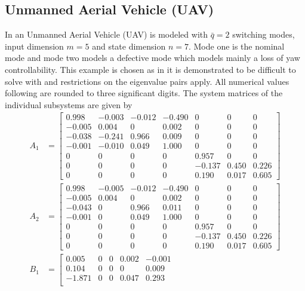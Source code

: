 \documentclass[11pt]{article}
\theoremstyle{plain}
\theoremstyle{definition}
\theoremstyle{remark}
\begin{document}
\subsection{Unmanned Aerial Vehicle (UAV)}
In \cite{honecker2025development} an Unmanned Aerial Vehicle (UAV) is modeled with $\bar q = 2$ switching modes, input dimension $m=5$ and state dimension $n=7$. Mode one is the nominal mode and mode two models a defective mode which models mainly a loss of yaw controllability. This example is chosen as  in \cite{honecker2025development} it is demonstrated to be difficult to solve with \cite{HoneckerGWTR24} and restrictions on the eigenvalue pairs apply. All numerical values following are rounded to three significant digits. The system matrices of the individual subsystems are given by
\begin{align*}
    A_{1} &= \left[\begin{smallmatrix}
    0.998 & -0.003 & -0.012 & -0.490 & 0 & 0 & 0 \\
    -0.005 & 0.004 & 0 & 0.002 & 0 & 0 & 0 \\
    -0.038 & -0.241 & 0.966 & 0.009 & 0 & 0 & 0 \\
    -0.001 & -0.010 & 0.049 & 1.000 & 0 & 0 & 0 \\
    0 & 0 & 0 & 0 & 0.957 & 0 & 0 \\
    0 & 0 & 0 & 0 & -0.137 & 0.450 & 0.226 \\
    0 & 0 & 0 & 0 & 0.190 & 0.017 & 0.605
\end{smallmatrix}\right] \\
    A_{2} &= \left[\begin{smallmatrix}
    0.998 & -0.005 & -0.012 & -0.490 & 0 & 0 & 0 \\
    -0.005 & 0.004 & 0 & 0.002 & 0 & 0 & 0 \\
    -0.043 & 0 & 0.966 & 0.011 & 0 & 0 & 0 \\
    -0.001 & 0 & 0.049 & 1.000 & 0 & 0 & 0 \\
    0 & 0 & 0 & 0 & 0.957 & 0 & 0 \\
    0 & 0 & 0 & 0 & -0.137 & 0.450 & 0.226 \\
    0 & 0 & 0 & 0 & 0.190 & 0.017 & 0.605
\end{smallmatrix}\right] \\
   B_{1} &= \left[\begin{smallmatrix}
    0.005 & 0 & 0 & 0.002 & -0.001 \\
    0.104 & 0 & 0 & 0 & 0.009 \\
    -1.871 & 0 & 0 & 0.047 & 0.293 \\

\end{smallmatrix}
\end{align*}
\end{document}
